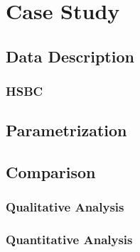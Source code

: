 \chapter{Case Study}\label{empiricalanalysis}

\section{Data Description}

\subsection{HSBC}

\section{Parametrization}

\section{Comparison}

\subsection{Qualitative Analysis}

\subsection{Quantitative Analysis}